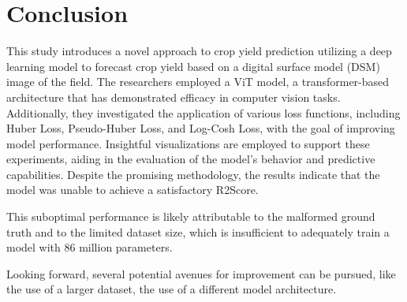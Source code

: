 \section{Conclusion}
\label{sec:conclusion}

This study introduces a novel approach to crop yield prediction utilizing a deep learning model to forecast crop yield based on a digital surface model (DSM) image of the field. The researchers employed a ViT model, a transformer-based architecture that has demonstrated efficacy in computer vision tasks. Additionally, they investigated the application of various loss functions, including Huber Loss, Pseudo-Huber Loss, and Log-Cosh Loss, with the goal of improving model performance. Insightful visualizations are employed to support these experiments, aiding in the evaluation of the model's behavior and predictive capabilities.
Despite the promising methodology, the results indicate that the model was unable to achieve a satisfactory R2Score. 

This suboptimal performance is likely attributable to the malformed ground truth and to the limited dataset size, which is insufficient to adequately train a model with 86 million parameters. 

Looking forward, several potential avenues for improvement can be pursued, like the use of a larger dataset, the use of a different model architecture.
